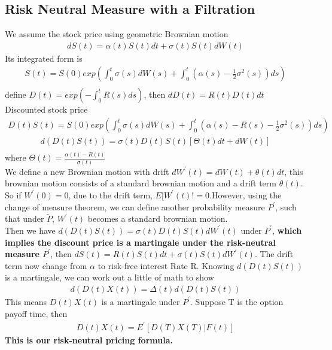 \documentclass[a4paper]{article}
\begin{document}
\subsection{Risk Neutral Measure with a Filtration}
We assume the stock price using geometric Brownian motion\\
\begin{align*}
dS(t) = \alpha(t) S(t) dt + \sigma(t) S(t) d W(t)
\end{align*}
Its integrated form is\\
\begin{align*}
	S(t) = S(0) exp(\int _0 ^t \sigma(s) dW(s) + \int _0 ^t (\alpha(s) - \frac{1}{2} \sigma^2(s)) ds)\\
\end{align*}
define $D(t) = exp(-\int_0^t R(s) ds) $, then $dD(t) = R(t)D(t)dt$\\
Discounted stock price\\
\begin{align*}
	D(t)S(t) = S(0) exp(\int_0^t \sigma(s) dW(s) + \int_0^t (\alpha(s) - R(s) - \frac{1}{2} \sigma^2(s)) ds)
\end{align*}
\begin{align*}
	d(D(t) S(t)) = \sigma(t) D(t) S(t) [\Theta(t) dt + dW(t)]\\
\end{align*}
where $\Theta(t) = \frac{\alpha(t) -R(t)}{\sigma(t)}$\\
We define a new Brownian motion with drift $dW^{'}(t) = dW(t) + \theta(t) dt$, this brownian motion consists of a standard brownian motion and a drift term $\theta(t)$. So if $W^{'}(0) = 0$, due to the drift term, $E[W^{'}(t) != 0$.However, using the change of measure theorem, we can define another probability measure $P^{'}$, such that under $\tilde P$, $W^{'}(t)$ becomes a standard brownian motion.\\
Then we have $d(D(t)S(t)) = \sigma(t) D(t) S(t) dW^{'}(t)$ under $P^{'}$, {\bf which implies the discount price is a martingale under the risk-neutral measure $P^{'}$}, then $dS(t) = R(t) S(t) dt + \sigma(t) S(t) d  W^{'}(t)$. The drift term now change from $\alpha$ to risk-free interest Rate R. Knowing $d(D(t)S(t))$ is a martingale, we can work out a little of math to show
\begin{align*}
	d(D(t)X(t)) = \Delta(t) d(D(t)S(t))
\end{align*}
This means $D(t)X(t)$ is a martingale under $P^{'}$. Suppose T is the option payoff time, then 
\begin{align*}
	D(t)X(t) = E^{'} [D(T) X(T) | F(t)]
\end{align*}
{\bf This is our risk-neutral pricing formula.}
\end{document}
